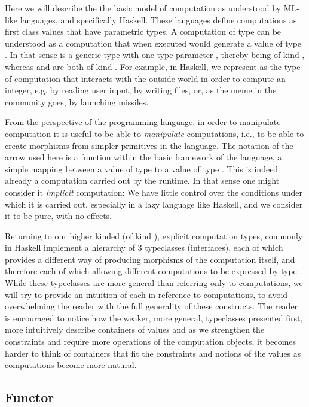 Here we will describe the the basic model of computation as understood
by ML-like languages, and specifically Haskell. These languages define
computations as first class values that have parametric types. A
computation of type  can be understood as a computation that
when executed would generate a value of type . In that sense
 is a generic type with one type parameter , thereby
being of kind \hask{* -> *}, whereas  and  are both
of kind \hask{*}. For example, in Haskell, we represent as  the type of computation that interacts with the outside world
in order to compute an integer, e.g. by reading user input, by writing
files, or, as the meme in the community goes, by launching missiles.

From the perspective of the programming language, in order to
manipulate computation it is useful to be able to \emph{manipulate}
computations, i.e., to be able to create morphisms 
from simpler primitives in the language. The notation of the arrow
\hask{->} used here is a function within the basic framework of the
language, a simple mapping between a value of type  to a
value of type . This is indeed already a computation carried
out by the runtime.  In that sense one might consider it
\emph{implicit} computation: We have little control over the
conditions under which it is carried out, especially in a lazy
language like Haskell, and we consider it to be pure, with no effects.

Returning to our higher kinded (of kind ), explicit
computation types, commonly in Haskell implement a hierarchy of 3
typeclasses (interfaces), each of which provides a different way of
producing morphisms of the computation itself, and therefore each of
which allowing different computations to be expressed by type
. While these typeclasses are more general than referring only
to computations, we will try to provide an intuition of each in
reference to computations, to avoid overwhelming the reader with the
full generality of these constructs. The reader is encouraged to
notice how the weaker, more general, typeclasses presented first, more
intuitively describe containers of values and as we strengthen the
constraints and require more operations of the computation objects, it
becomes harder to think of containers that fit the constraints and
notions of the values as computations become more natural.

\subsection{Functor}


